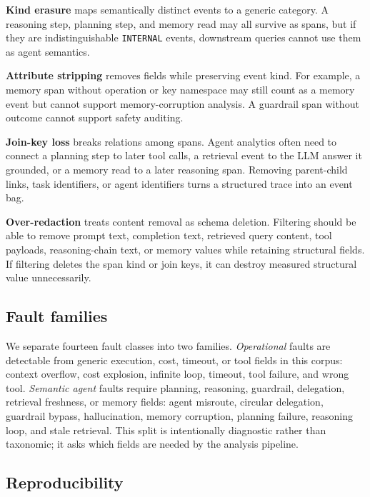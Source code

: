 \documentclass[conference]{IEEEtran}
\begin{document}
\textbf{Kind erasure} maps semantically distinct events to a generic
category. A reasoning step, planning step, and memory read may all
survive as spans, but if they are indistinguishable \texttt{INTERNAL}
events, downstream queries cannot use them as agent semantics.

\textbf{Attribute stripping} removes fields while preserving event kind.
For example, a memory span without operation or key namespace may still
count as a memory event but cannot support memory-corruption analysis. A
guardrail span without outcome cannot support safety auditing.

\textbf{Join-key loss} breaks relations among spans. Agent analytics
often need to connect a planning step to later tool calls, a retrieval
event to the LLM answer it grounded, or a memory read to a later
reasoning span. Removing parent-child links, task identifiers, or agent
identifiers turns a structured trace into an event bag.

\textbf{Over-redaction} treats content removal as schema deletion.
Filtering should be able to remove prompt text, completion text,
retrieved query content, tool payloads, reasoning-chain text, or memory
values while retaining structural fields. If filtering deletes the span
kind or join keys, it can destroy measured structural value
unnecessarily.

\subsection{Fault families}

We separate fourteen fault classes into two families.
\emph{Operational} faults are detectable from generic execution, cost,
timeout, or tool fields in this corpus: context overflow, cost
explosion, infinite loop, timeout, tool failure, and wrong tool.
\emph{Semantic agent} faults require planning, reasoning, guardrail,
delegation, retrieval freshness, or memory fields: agent misroute,
circular delegation, guardrail bypass, hallucination, memory corruption,
planning failure, reasoning loop, and stale retrieval. This split is
intentionally diagnostic rather than taxonomic; it asks which fields are
needed by the analysis pipeline.

\subsection{Reproducibility}
\end{document}
